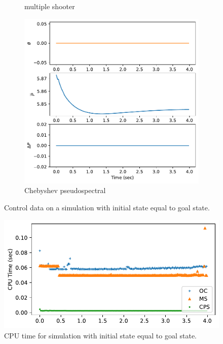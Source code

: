 \documentclass[]{article}
\begin{document}
\begin{figure}[H]
\begin{subfigure}[b]{0.3\textwidth}
		\caption{multiple shooter}
	\end{subfigure}
	\begin{subfigure}[b]{0.3\textwidth}
		\centering
		\includegraphics[width=\textwidth]{figures/controlhover5.pdf}
		\caption{Chebyshev pseudospectral}
	\end{subfigure}
	\caption{Control data on a simulation with initial state equal to goal state.}
	\label{fig:controlhover}
\end{figure}


\begin{figure}[H]
	\centering
	\includegraphics[width=\textwidth]{figures/timehover.pdf}
	\caption{CPU time for simulation with initial state equal to goal state.}
	\label{fig:timehover}
\end{figure}
\end{document}
